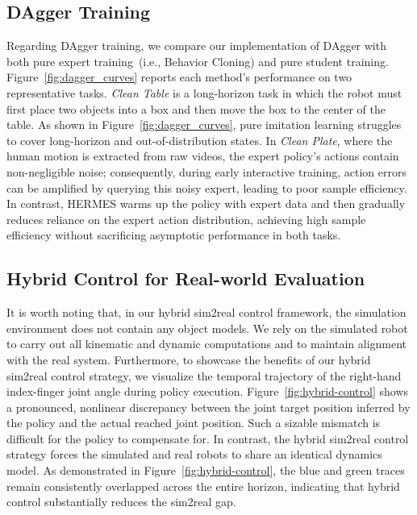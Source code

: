 \subsection{DAgger Training}
\label{sec:dagger_train}
Regarding DAgger training, we compare our implementation of DAgger with both pure expert training~(i.e., Behavior Cloning) and pure student training. Figure~\ref{fig:dagger_curves} reports each method’s performance on two representative tasks. \textit{Clean Table} is a long-horizon task in which the robot must first place two objects into a box and then move the box to the center of the table. As shown in Figure~\ref{fig:dagger_curves}, pure imitation learning struggles to cover long-horizon and out-of-distribution states. In \textit{Clean Plate}, where the human motion is extracted from raw videos, the expert policy’s actions contain non-negligible noise; consequently, during early interactive training, action errors can be amplified by querying this noisy expert, leading to poor sample efficiency. In contrast, HERMES warms up the policy with expert data and then gradually reduces reliance on the expert action distribution, achieving high sample efficiency without sacrificing asymptotic performance in both tasks.





\subsection{Hybrid Control for Real-world Evaluation}
\label{sec:hybrid}

It is worth noting that, in our hybrid sim2real control framework, the simulation environment does not contain any object models. We rely on the simulated robot to carry out all kinematic and dynamic computations and to maintain alignment with the real system. Furthermore, to showcase the benefits of our hybrid sim2real control strategy, we visualize the temporal trajectory of the right-hand index-finger joint angle during policy execution. Figure~\ref{fig:hybrid-control} shows a pronounced, nonlinear discrepancy between the joint target position inferred by the policy and the actual reached joint position. Such a sizable mismatch is difficult for the policy to compensate for. In contrast, the hybrid sim2real control strategy forces the simulated and real robots to share an identical dynamics model. As demonstrated in Figure~\ref{fig:hybrid-control}, the blue and green traces remain consistently overlapped across the entire horizon, indicating that hybrid control substantially reduces the sim2real gap.


